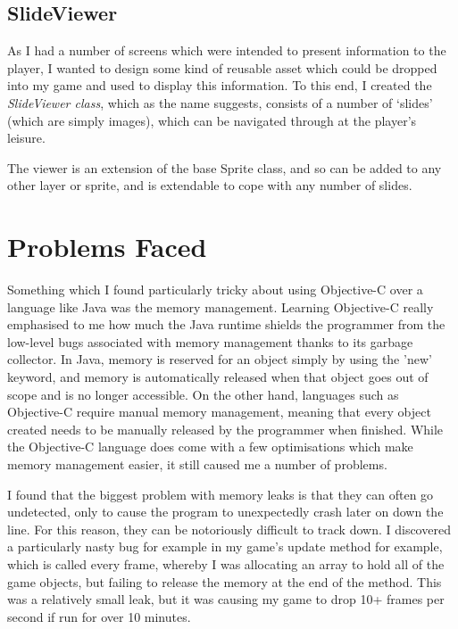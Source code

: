 \documentclass[a4paper,oneside]{report}
\begin{document}
\subsection{SlideViewer}

As I had a number of screens which were intended to present information to the player, I wanted to design some kind of reusable asset which could be dropped into my game and used to display this information. To this end, I created the \emph{SlideViewer class}, which as the name suggests, consists of a number of `slides' (which are simply images), which can be navigated through at the player's leisure.

The viewer is an extension of the base Sprite class, and so can be added to any other layer or sprite, and is extendable to cope with any number of slides.
		
\section{Problems Faced} 

Something which I found particularly tricky about using Objective-C over a language like Java was the memory management. Learning Objective-C really emphasised to me how much the Java runtime shields the programmer from the low-level bugs associated with memory management thanks to its garbage collector. In Java, memory is reserved for an object simply by using the 'new' keyword, and memory is automatically released when that object goes out of scope and is no longer accessible. On the other hand, languages such as Objective-C  require manual memory management, meaning that every object created needs to be manually released by the programmer when finished. While the Objective-C language does come with a few optimisations which make memory management easier, it still caused me a number of problems. 

I found that the biggest problem with memory leaks is that they can often go undetected, only to cause the program to unexpectedly crash later on down the line. For this reason, they can be notoriously difficult to track down. I discovered a particularly nasty bug for example in my game's update method for example, which is called every frame, whereby I was allocating an array to hold all of the game objects, but failing to release the memory at the end of the method. This was a relatively small leak, but it was causing my game to drop 10+ frames per second if run for over 10 minutes.
\end{document}
